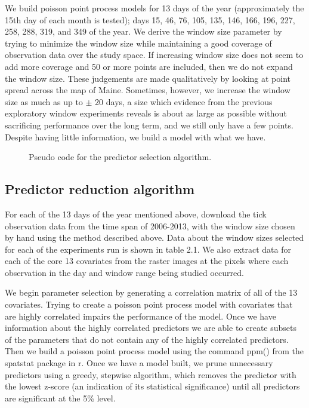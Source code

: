 \noindent We build poisson point process models for 13 days of the year (approximately the 15th day of each month is tested); days 15, 46, 76, 105, 135, 146, 166, 196, 227, 258, 288, 319, and 349 of the year. We derive the window size parameter by trying to minimize the window size while maintaining a good coverage of observation data over the study space. If increasing window size does not seem to add more coverage and 50 or more points are included, then we do not expand the window size. These judgements are made qualitatively by looking at point spread across the map of Maine. Sometimes, however, we increase the window size as much as up to $\pm$ 20 days, a size which evidence from the previous exploratory window experiments reveals is about as large as possible without sacrificing performance over the long term, and we still only have a few points. Despite having little information, we build a model with what we have.  \newline

\begin{figure} [!ht]
\centerline{}
\caption{Pseudo code for the predictor selection algorithm. }
\label{fig6}
\end{figure}
\subsection{ Predictor reduction algorithm}

For each of the 13 days of the year mentioned above, download the tick observation data from the time span of 2006-2013, with the window size chosen by hand using the method described above. Data about the window sizes selected for each of the experiments run is shown in table 2.1. We also extract data for each of the core 13 covariates from the raster images at the pixels where each observation in the day and window range being studied occurred. \newline

\noindent We begin parameter selection by generating a correlation matrix of all of the 13 covariates. Trying to create a poisson point process model with covariates that are highly correlated impairs the performance of the model. Once we have information about the highly correlated predictors we are able to create subsets of the parameters that do not contain any of the highly correlated predictors. Then we build a poisson point process model using the command ppm() from the spatstat package in r. Once we have a model built, we prune unnecessary predictors using a greedy, stepwise algorithm, which removes the predictor with the lowest z-score (an indication of its statistical significance) until all predictors are significant at the 5\% level.  \newline

